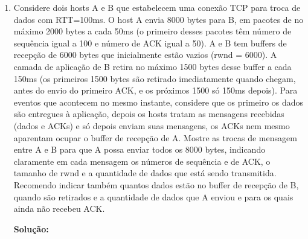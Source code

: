 \documentclass{article}
\begin{document}
\begin{enumerate}
\item Considere dois hosts A e B que estabelecem uma conexão TCP para troca de dados com RTT=100ms. O host A envia 8000 bytes para B, em pacotes de no máximo 2000 bytes a cada 50ms (o primeiro desses pacotes têm número de sequência igual a 100 e número de ACK igual a 50). A e B tem buffers de recepção de 6000 bytes que inicialmente estão vazios (rwnd = 6000). A camada de aplicação de B retira no máximo 1500 bytes desse buffer a cada 150ms (os primeiros 1500 bytes são retirado imediatamente quando chegam, antes do envio do primeiro ACK, e os próximos 1500 só 150ms depois). Para eventos que acontecem no mesmo instante, considere que os primeiro os dados são entregues à aplicação, depois os hosts tratam as mensagens recebidas (dados e ACKs) e só depois enviam suas mensagens, os ACKs nem mesmo aparentam ocupar o buffer de recepção de A. Mostre as trocas de mensagem entre A e B para que A possa enviar todos os 8000 bytes, indicando claramente em cada mensagem os números de sequência e de ACK, o tamanho de rwnd e a quantidade de dados que está sendo transmitida. Recomendo indicar também quantos dados estão no buffer de recepção de B, quando são retirados e a quantidade de dados que A enviou e para os quais ainda não recebeu ACK.
\begin{addmargin}[0.5in]{0.5in}
\par \textbf{Solução:}
\end{addmargin}

\end{enumerate}
\end{document}
